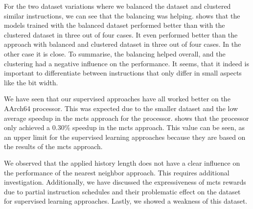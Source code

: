 For the two dataset variations where we balanced the dataset and clustered similar instructions, we can see that the balancing was helping.
 shows that the models trained with the balanced dataset performed better than with the clustered dataset in three out of four cases.
It even performed better than the approach with balanced and clustered dataset in three out of four cases.
In the other case it is close.
To summarise, the balancing helped overall, and the clustering had a negative influence on the performance.
It seems, that it indeed is important to differentiate between instructions that only differ in small aspects like the bit width. 

We have seen that our supervised approaches have all worked better on the AArch64 processor.
This was expected due to the smaller dataset and the low average speedup in the \ac{mcts} approach for the \aurora processor.
 shows that the \aurora processor only achieved a 0.30\% speedup in the \ac{mcts} approach.
This value can be seen, as an upper limit for the supervised learning approaches because they are based on the results of the \ac{mcts} approach.

We observed that the applied history length does not have a clear influence on the performance of the nearest neighbor approach.
This requires additional investigation.
Additionally, we have discussed the expressiveness of \ac{mcts} rewards due to partial instruction schedules and their problematic effect on the dataset for supervised learning approaches.
Lastly, we showed a weakness of this dataset.
